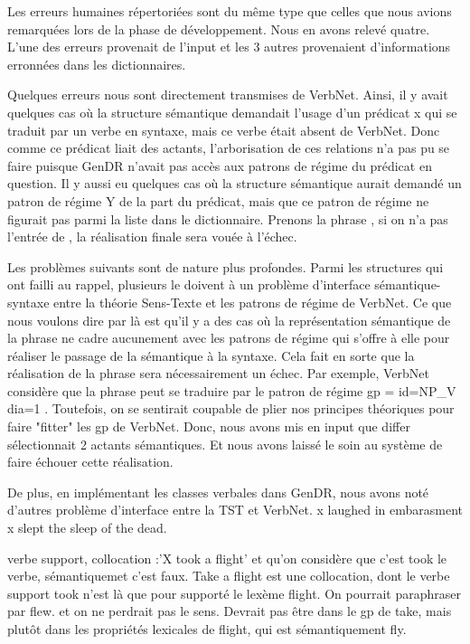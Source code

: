 Les erreurs humaines répertoriées sont du même type que celles que nous avions remarquées lors de la phase de développement. Nous en avons relevé quatre. L'une des erreurs provenait de l'input et les 3 autres provenaient d'informations erronnées dans les dictionnaires.

Quelques erreurs nous sont directement transmises de VerbNet. Ainsi, il y avait quelques cas où la structure sémantique demandait l'usage d'un prédicat x qui se traduit par un verbe en syntaxe, mais ce verbe était absent de VerbNet. Donc comme ce prédicat liait des actants, l'arborisation de ces relations n'a pas pu se faire puisque GenDR n'avait pas accès aux patrons de régime du prédicat en question. Il y aussi eu quelques cas où la structure sémantique aurait demandé un patron de régime Y de la part du prédicat, mais que ce patron de régime ne figurait pas parmi la liste dans le dictionnaire. Prenons la phrase , si on n'a pas l'entrée de , la réalisation finale sera vouée à l'échec.

Les problèmes suivants sont de nature plus profondes. Parmi les structures qui ont failli au rappel, plusieurs le doivent à un problème d'interface sémantique-syntaxe entre la théorie Sens-Texte et les patrons de régime de VerbNet. Ce que nous voulons dire par là est qu'il y a des cas où la représentation sémantique de la phrase ne cadre aucunement avec les patrons de régime qui s'offre à elle pour réaliser le passage de la sémantique à la syntaxe. Cela fait en sorte que la réalisation de la phrase sera nécessairement un échec. Par exemple, VerbNet considère que la phrase  peut se traduire par le patron de régime gp = { id=NP\_V dia=1 }. Toutefois, on se sentirait coupable de plier nos principes théoriques pour faire "fitter" les gp de VerbNet. Donc, nous avons mis en input que differ sélectionnait 2 actants sémantiques. Et nous avons laissé le soin au système de faire échouer cette réalisation. 

De plus, en implémentant les classes verbales dans GenDR, nous avons noté d'autres problème d'interface entre la \ac{TST} et VerbNet. 
x laughed in embarasment 
x slept the sleep of the dead. 

verbe support, collocation :'X took a flight' et qu'on considère que c'est took le verbe, sémantiquemet c'est faux. Take a flight est une collocation, dont le verbe support took n'est là que pour supporté le lexème flight. On pourrait paraphraser par flew. et on ne perdrait pas le sens. Devrait pas être dans le gp de take, mais plutôt dans les propriétés lexicales de flight, qui est sémantiquement fly. 

